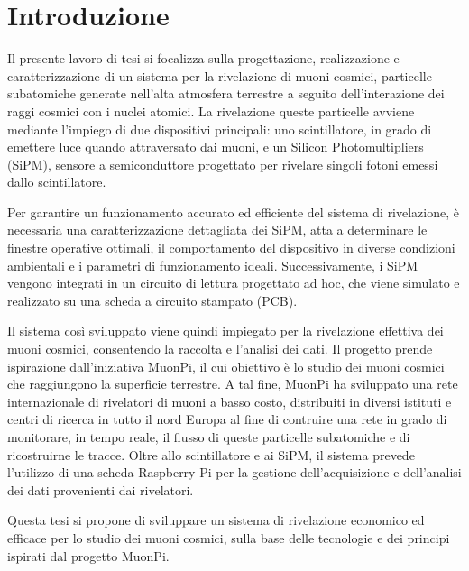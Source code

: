 \chapter*{Introduzione}
Il presente lavoro di tesi si focalizza sulla progettazione, realizzazione e caratterizzazione di un sistema per la rivelazione di muoni 
cosmici, particelle subatomiche generate nell’alta atmosfera terrestre a seguito dell'interazione dei raggi cosmici con i nuclei atomici. 
La rivelazione queste particelle avviene mediante l’impiego di due dispositivi principali: uno scintillatore, in grado di emettere luce quando attraversato
dai muoni, e un Silicon Photomultipliers (SiPM), sensore a semiconduttore progettato per rivelare singoli fotoni emessi dallo scintillatore.

Per garantire un funzionamento accurato ed efficiente del sistema di rivelazione, è necessaria una caratterizzazione dettagliata dei SiPM, 
atta a determinare le finestre operative ottimali, il comportamento del dispositivo in diverse condizioni ambientali e i parametri di 
funzionamento ideali. Successivamente, i SiPM vengono integrati in un circuito di lettura progettato ad hoc, che viene simulato e 
realizzato su una scheda a circuito stampato (PCB).

Il sistema così sviluppato viene quindi impiegato per la rivelazione effettiva dei muoni cosmici, consentendo la raccolta e l’analisi dei 
dati. Il progetto prende ispirazione dall'iniziativa MuonPi, il cui obiettivo è lo studio dei muoni cosmici che raggiungono la superficie 
terrestre. A tal fine, MuonPi \cite{muonpiwikicontributors_2017} ha sviluppato una rete internazionale di rivelatori di muoni a basso costo,
distribuiti in diversi istituti e centri di ricerca in tutto il nord Europa al fine di contruire una rete in grado di monitorare,
in tempo reale, il flusso di queste particelle subatomiche e di ricostruirne le tracce. Oltre allo scintillatore e ai SiPM, il sistema 
prevede l’utilizzo di una scheda Raspberry Pi per la gestione dell’acquisizione e dell’analisi dei dati provenienti dai rivelatori.

Questa tesi si propone di sviluppare un sistema di rivelazione economico ed efficace per lo studio dei muoni cosmici, sulla base delle 
tecnologie e dei principi ispirati dal progetto MuonPi.
